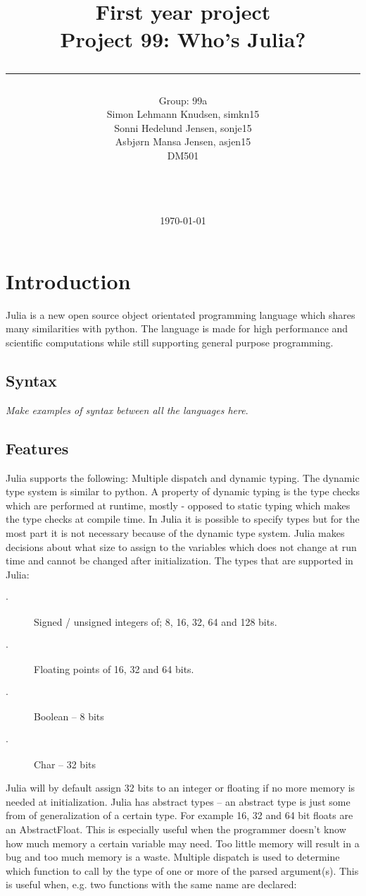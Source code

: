 \documentclass[a4paper,11pt]{article}
\title{First year project\\Project 99: Who's Julia?\\\rule{10cm}{0.5mm}}
\author{Group: 99a\\Simon Lehmann Knudsen, simkn15\\Sonni Hedelund Jensen, sonje15\\Asbjørn Mansa Jensen, asjen15
	\\ DM501\\\rule{5.5cm}{0.5mm}\\}
\date{\today}
\begin{document}
\maketitle

\vfill

\newpage
\tableofcontents

\newpage
\section{Introduction}
Julia is a new open source object orientated programming language which shares many similarities with python. The language is made for high performance and scientific computations while still supporting general purpose programming. 

\subsection{Syntax}
\textit{Make examples of syntax between all the languages here}.

\subsection{Features}
Julia supports the following: Multiple dispatch and dynamic typing. The dynamic type system is similar to python. A property of dynamic typing is the type checks which are performed at runtime, mostly - opposed to static typing which makes the type checks at compile time. In Julia it is possible to specify types but for the most part it is not necessary because of the dynamic type system. Julia makes decisions about what size to assign to the variables which does not change at run time and cannot be changed after initialization. The types that are supported in Julia:
\begin{description}
	\item[$\cdot$] Signed / unsigned integers of; 8, 16, 32, 64 and 128 bits.
	\item[$\cdot$] Floating points of 16, 32 and 64 bits.  
	\item[$\cdot$] Boolean – 8 bits 
	\item[$\cdot$] Char – 32 bits 
\end{description}

Julia will by default assign 32 bits to an integer or floating if no more memory is needed at initialization. Julia has abstract types – an abstract type is just some from of generalization of a certain type. For example 16, 32 and 64 bit floats are an AbstractFloat. This is especially useful when the programmer doesn't know how much memory a certain variable may need. Too little memory will result in a bug and too much memory is a waste. Multiple dispatch is used to determine which function to call by the type of one or more of the parsed argument(s). This is useful when, e.g. two functions with the same name are declared:
\end{document}
